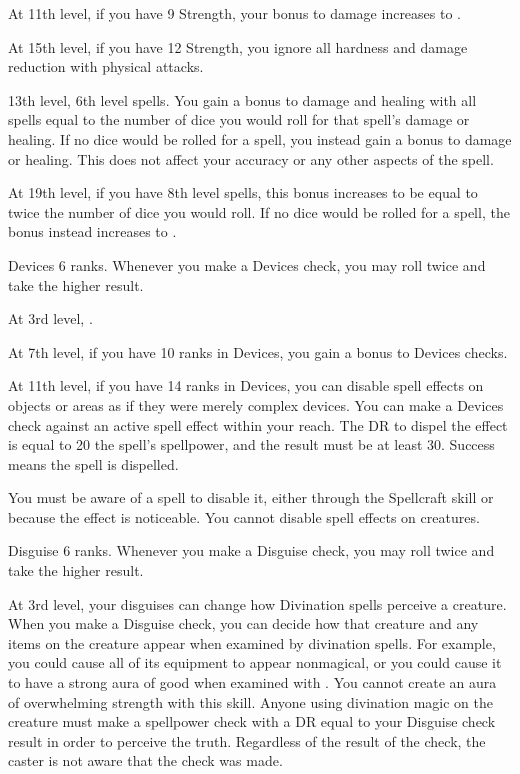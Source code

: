     At 11th level, if you have 9 Strength, your bonus to damage increases to .

    At 15th level, if you have 12 Strength, you ignore all hardness and damage reduction with physical attacks.

    \featpre 13th level, 6th level spells.
    \featben You gain a bonus to damage and healing with all spells equal to the number of dice you would roll for that spell's damage or healing.
    If no dice would be rolled for a spell, you instead gain a  bonus to damage or healing.
    This does not affect your accuracy or any other aspects of the spell.

    At 19th level, if you have 8th level spells, this bonus increases to be equal to twice the number of dice you would roll.
    If no dice would be rolled for a spell, the bonus instead increases to .

    \featpre Devices 6 ranks.
    \featben Whenever you make a Devices check, you may roll twice and take the higher result.

    At 3rd level, \tdash.

    At 7th level, if you have 10 ranks in Devices, you gain a  bonus to Devices checks.

    At 11th level, if you have 14 ranks in Devices, you can disable spell effects on objects or areas as if they were merely complex devices.
    You can make a Devices check against an active spell effect within your reach.
    The DR to dispel the effect is equal to 20 \add the spell's spellpower, and the result must be at least 30.
    Success means the spell is dispelled.
    \magical

    You must be aware of a spell to disable it, either through the Spellcraft skill or because the effect is noticeable.
    You cannot disable spell effects on creatures.

    \featpre Disguise 6 ranks.
    \featben Whenever you make a Disguise check, you may roll twice and take the higher result.

    At 3rd level, your disguises can change how Divination spells perceive a creature.
    When you make a Disguise check, you can decide how that creature and any items on the creature appear when examined by divination spells.
    For example, you could cause all of its equipment to appear nonmagical, or you could cause it to have a strong aura of good when examined with .
    You cannot create an aura of overwhelming strength with this skill.
    Anyone using divination magic on the creature must make a spellpower check with a DR equal to your Disguise check result in order to perceive the truth.
    Regardless of the result of the check, the caster is not aware that the check was made.
    \magical

